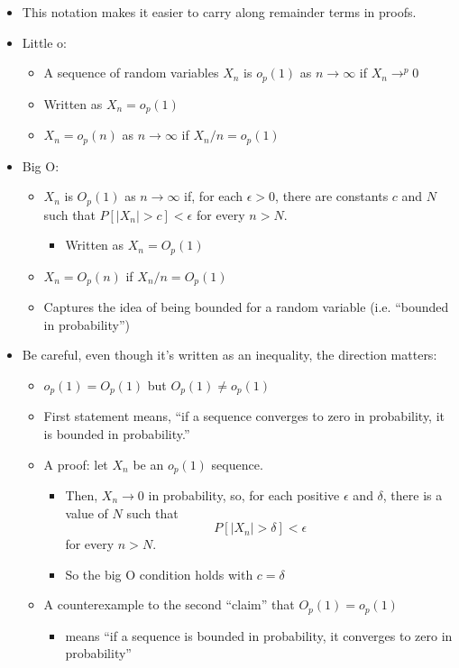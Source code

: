 \begin{itemize}
\item This notation makes it easier to carry along remainder terms in
       proofs.
\item Little o:
\begin{itemize}
\item A sequence of random variables $X_n$ is $o_p(1)$ as $n \to
         \infty$ if $X_n \to^p 0$
\item Written as $X_n = o_p(1)$
\item $X_n = o_p(n)$ as $n \to \infty$ if $X_n/n = o_p(1)$
\end{itemize}
\item Big O:
\begin{itemize}
\item $X_n$ is $O_p(1)$ as $n \to \infty$ if, for each $\epsilon >
         0$, there are constants $c$ and $N$ such that $P[|X_n| > c] < \epsilon$ for every $n > N$.
\begin{itemize}
\item Written as $X_n = O_p(1)$
\end{itemize}
\item $X_n = O_p(n)$ if $X_n/n = O_p(1)$
\item Captures the idea of being bounded for a random variable
         (i.e. ``bounded in probability'')
\end{itemize}
\item Be careful, even though it's written as an inequality, the direction matters:
\begin{itemize}
\item $o_p(1) = O_p(1)$ but $O_p(1) \neq o_p(1)$
\item First statement means, ``if a sequence converges to zero in
         probability, it is bounded in probability.''
\item A proof: let $X_n$ be an $o_p(1)$ sequence.
\begin{itemize}
\item Then, $X_n \to 0$ in probability, so, for each positive
           $\epsilon$ and $\delta$, there is a value of $N$ such that
           \[P[|X_n| > \delta] < \epsilon\] for every $n > N$.
\item So the big O condition holds with $c = \delta$
\end{itemize}
\item A counterexample to the second ``claim'' that $O_p(1) = o_p(1)$
\begin{itemize}
\item means ``if a sequence is bounded in probability, it converges to zero in probability''

\end{itemize}
\end{itemize}
\end{itemize}
